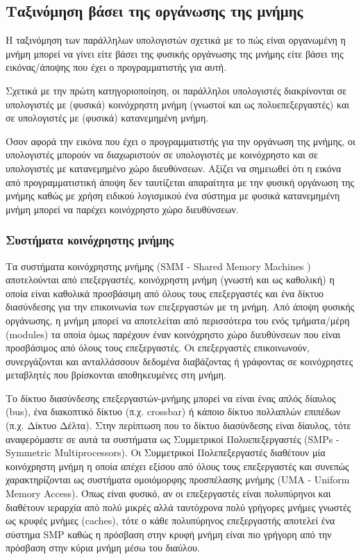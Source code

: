 \subsection{Ταξινόμηση βάσει της οργάνωσης της μνήμης}
\label{ssec:Classification based on memory organization}
Η ταξινόμηση των παράλληλων υπολογιστών σχετικά με το πώς είναι οργανωμένη η μνήμη μπορεί να γίνει είτε βάσει της φυσικής οργάνωσης της μνήμης είτε βάσει της εικόνας/άποψης που έχει ο προγραμματιστής για αυτή.

Σχετικά με την πρώτη κατηγοριοποίηση, οι παράλληλοι υπολογιστές διακρίνονται σε υπολογιστές με (φυσικά) κοινόχρηστη μνήμη (γνωστοί και ως πολυεπεξεργαστές) και σε υπολογιστές με (φυσικά) κατανεμημένη μνήμη.

Όσον αφορά την εικόνα που έχει ο προγραμματιστής για την οργάνωση της μνήμης, οι υπολογιστές μπορούν να διαχωριστούν σε υπολογιστές με κοινόχρηστο και σε υπολογιστές με κατανεμημένο χώρο διευθύνσεων. Αξίζει να σημειωθεί ότι η εικόνα από προγραμματιστική άποψη δεν ταυτίζεται απαραίτητα με την φυσική οργάνωση της μνήμης καθώς με χρήση ειδικού λογισμικού ένα σύστημα με φυσικά κατανεμημένη μνήμη μπορεί να παρέχει κοινόχρηστο χώρο διευθύνσεων.


\subsubsection{Συστήματα κοινόχρηστης μνήμης}
Τα συστήματα κοινόχρηστης μνήμης (SMM - Shared Memory Machines \cite{rauber2010parallel}) αποτελούνται από επεξεργαστές, κοινόχρηστη μνήμη (γνωστή και ως καθολική) η οποία είναι καθολικά προσβάσιμη από όλους τους επεξεργαστές και ένα δίκτυο διασύνδεσης για την επικοινωνία των επεξεργαστών με τη μνήμη. Από άποψη φυσικής οργάνωσης, η μνήμη μπορεί να αποτελείται από περισσότερα του ενός τμήματα/μέρη (modules) τα οποία όμως παρέχουν έναν κοινόχρηστο χώρο διευθύνσεων που είναι προσβάσιμος από όλους τους επεξεργαστές. Οι επεξεργαστές επικοινωνούν, συνεργάζονται και ανταλλάσσουν δεδομένα διαβάζοντας ή γράφοντας σε κοινόχρηστες μεταβλητές που βρίσκονται αποθηκευμένες στη μνήμη.

Το δίκτυο διασύνδεσης επεξεργαστών-μνήμης μπορεί να είναι ένας απλός δίαυλος (bus), ένα διακοπτικό δίκτυο (π.χ. crossbar) ή κάποιο δίκτυο πολλαπλών επιπέδων (π.χ. Δίκτυο Δέλτα). Στην περίπτωση που το δίκτυο διασύνδεσης είναι δίαυλος, τότε αναφερόμαστε σε αυτά τα συστήματα ως Συμμετρικοί Πολυεπεξεργαστές (SMPs - Symmetric Multiprocessors). Οι Συμμετρικοί Πολεπεξεργαστές διαθέτουν μία κοινόχρηστη μνήμη η οποία απέχει εξίσου από όλους τους επεξεργαστές και συνεπώς χαρακτηρίζονται ως συστήματα ομοιόμορφης προσπέλασης μνήμης (UMA - Uniform Memory Access). Όπως είναι φυσικό, αν οι επεξεργαστές είναι πολυπύρηνοι και διαθέτουν ιεραρχία από πολύ μικρές αλλά ταυτόχρονα πολύ γρήγορες μνήμες γνωστές ως κρυφές μνήμες (caches), τότε ο κάθε πολυπύρηνος επεξεργαστής αποτελεί ένα σύστημα SMP καθώς η πρόσβαση στην κρυφή μνήμη είναι πιο γρήγορη από την πρόσβαση στην κύρια μνήμη μέσω του διαύλου.

